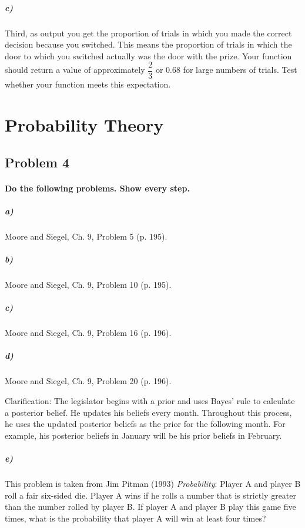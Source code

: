\documentclass[12pt,letter]{article}
\begin{document}
\subparagraph{c)} Third, as output you get the proportion of trials in which you made the correct decision because you switched. This means the proportion of trials in which the door to which you switched actually was the door with the prize. Your function should return a value of  approximately $\dfrac{2}{3}$ or 0.68 for large numbers of trials. Test whether your function meets this expectation.



\section*{Probability Theory}

\subsection*{Problem 4}

\paragraph{Do the following problems. Show every step.}

\subparagraph{a)} Moore and Siegel, Ch. 9, Problem 5 (p. 195).

\subparagraph{b)} Moore and Siegel, Ch. 9, Problem 10 (p. 195).

\subparagraph{c)} Moore and Siegel, Ch. 9, Problem 16 (p. 196).

\subparagraph{d)} Moore and Siegel, Ch. 9, Problem 20 (p. 196).

Clarification: The legislator begins with a prior and uses Bayes' rule to calculate a posterior belief. He updates his beliefs every month. Throughout this process, he uses the updated posterior beliefs as the prior for the following month. For example, his posterior beliefs in January will be his prior beliefs in February.

\subparagraph{e)} This problem is taken from Jim Pitman (1993) \textit{Probability}: Player A and player B roll a fair six-sided die. Player A wins if he rolls a number that is strictly greater than the number rolled by player B. If player A and player B play this game five times, what is the probability that player A will win at least four times? %
\end{document}
